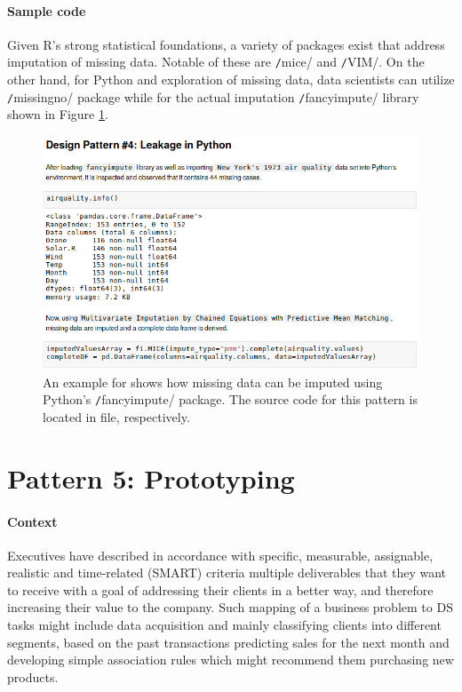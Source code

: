 \paragraph*{Sample code}
Given R's strong statistical foundations, a variety of packages exist that address imputation of missing data. 
Notable of these are \texttt/mice/ and \texttt/VIM/. 
On the other hand, for Python and exploration of missing data, data scientists can utilize \texttt/missingno/ package while for the actual imputation \texttt/fancyimpute/ library shown in Figure \ref{lst:code_pattern4Leak}.

\begin{figure}[!ht]
\centering
\includegraphics[width=\textwidth+2cm,height=\textheight,keepaspectratio]{images_dp/code_listing_4_leakage}
\caption[Example for Leakage Design Pattern.]{An example for  shows how missing data can be imputed using Python's \texttt/fancyimpute/ package.
The source code for this pattern is located in  file,  respectively.}
\label{lst:code_pattern4Leak}
\end{figure}

\section{Pattern 5: Prototyping}
\paragraph*{Context}
Executives have described in accordance with specific, measurable, assignable, realistic and time-related (SMART) criteria multiple deliverables that they want to receive with a goal of addressing their clients in a better way, and therefore increasing their value to the company.
Such mapping of a business problem to \ac{DS} tasks might include data acquisition and mainly classifying clients into different segments, based on the past transactions predicting sales for the next month and developing simple association rules which might recommend them purchasing new products.

